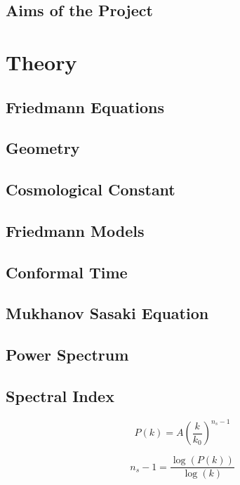 \documentclass[12pt]{article} %
\begin{document}
\subsection{Aims of the Project}

\section{Theory}

\subsection{Friedmann Equations}

\subsection{Geometry}

\subsection{Cosmological Constant}

\subsection{Friedmann Models}

\subsection{Conformal Time}

\subsection{Mukhanov Sasaki Equation}

\subsection{Power Spectrum}

\subsection{Spectral Index}

\begin{equation}\label{powerspec}
P(k)=A \left(\frac{k}{k_{0}}\right)^{n_{s}-1}
\end{equation}

\begin{equation}\label{logpowerspec}
n_{s}-1 = \frac{\log (P(k))}{\log(k)}
\end{equation}
\end{document}
